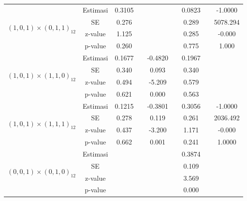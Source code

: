 \begin{enumerate}[label=\alph*.]
\begin{longtable}{|c|c|c|c|c|c|c|c|c|}
            \multirow{4}{*}{$(1,0,1)\times(0,1,1)_{12}$}
            & Estimasi & 0.3105  & {} & {} & {} & 0.0823 & {} & -1.0000\\ \cline{2-9}
            & SE       & 0.276 & {} & {} & {} & 0.289 & {} & 5078.294\\ \cline{2-9}
            & z-value  & 1.125  & {} & {} & {} & 0.285 & {}& -0.000\\ \cline{2-9}
            & p-value  & 0.260 & {} & {} & {} & 0.775 & {} & 1.000\\ \hline

            \multirow{4}{*}{$(1,0,1)\times(1,1,0)_{12}$}
            & Estimasi & 0.1677  & {} & -0.4820 & {} & 0.1967 & {} & {}\\ \cline{2-9}
            & SE       & 0.340 & {} & 0.093 & {} & 0.340 & {} & {}\\ \cline{2-9}
            & z-value  & 0.494  & {} & -5.209 & {} & 0.579 & {}& {}\\ \cline{2-9}
            & p-value  & 0.621 & {} & 0.000 & {} & 0.563 & {} & {}\\ \hline

            \multirow{4}{*}{$(1,0,1)\times(1,1,1)_{12}$}
            & Estimasi & 0.1215  & {} & -0.3801 & {} & 0.3056 & {} & -1.0000\\ \cline{2-9}
            & SE       & 0.278 & {} & 0.119 & {} & 0.261 & {} & 2036.492\\ \cline{2-9}
            & z-value  & 0.437  & {} & -3.200 & {} & 1.171 & {}& -0.000\\ \cline{2-9}
            & p-value  & 0.662 & {} & 0.001 & {} & 0.241 & {} & 1.0000\\ \hline

            \multirow{4}{*}{$(0,0,1)\times(0,1,0)_{12}$}
            & Estimasi & {} & {} & {} & {} & 0.3874 & {} & {}\\ \cline{2-9}
            & SE       & {} & {} & {} & {} & 0.109 & {} & {}\\ \cline{2-9}
            & z-value  & {} & {} & {} & {} & 3.569 & {}& {}\\ \cline{2-9}
            & p-value  & {} & {} & {} & {} & 0.000 & {} & {}\\ \hline


\end{longtable}
\end{enumerate}
